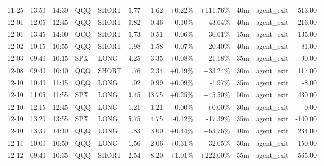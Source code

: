 \documentclass[11pt,a4paper,twoside]{article}
\begin{document}
\begin{center}
\begin{longtable}{>{\color{txtmain}}l l l l l r r r r r >{\color{txtmain}}l r}
11-25 & 13:50 & 14:30 & QQQ & SHORT & 0.77 & 1.62 & \textcolor{wingreen}{+0.22\%} & \textcolor{wingreen}{+111.76\%} & 40m & agent\_exit & \textcolor{wingreen}{513.00} \\
12-01 & 12:05 & 12:45 & QQQ & SHORT & 0.82 & 0.46 & \textcolor{lossred}{-0.10\%} & \textcolor{lossred}{-43.64\%} & 40m & agent\_exit & \textcolor{lossred}{-216.00} \\
12-01 & 13:45 & 14:00 & QQQ & SHORT & 0.73 & 0.51 & \textcolor{lossred}{-0.06\%} & \textcolor{lossred}{-30.61\%} & 15m & agent\_exit & \textcolor{lossred}{-135.00} \\
12-02 & 10:15 & 10:55 & QQQ & SHORT & 1.98 & 1.58 & \textcolor{lossred}{-0.07\%} & \textcolor{lossred}{-20.40\%} & 40m & agent\_exit & \textcolor{lossred}{-81.00} \\
12-03 & 09:40 & 10:15 & SPX & LONG & 4.25 & 3.35 & \textcolor{wingreen}{+0.08\%} & \textcolor{lossred}{-21.18\%} & 35m & agent\_exit & \textcolor{lossred}{-90.00} \\
12-08 & 09:40 & 10:10 & QQQ & SHORT & 1.76 & 2.34 & \textcolor{wingreen}{+0.19\%} & \textcolor{wingreen}{+33.24\%} & 30m & agent\_exit & \textcolor{wingreen}{117.00} \\
12-10 & 10:40 & 11:15 & QQQ & LONG & 1.02 & 0.99 & \textcolor{wingreen}{+0.09\%} & \textcolor{lossred}{-1.97\%} & 35m & agent\_exit & \textcolor{lossred}{-8.00} \\
12-10 & 11:05 & 11:55 & SPX & LONG & 9.45 & 13.75 & \textcolor{wingreen}{+0.25\%} & \textcolor{wingreen}{+45.50\%} & 50m & agent\_exit & \textcolor{wingreen}{430.00} \\
12-10 & 12:15 & 12:45 & QQQ & LONG & 1.21 & 1.21 & \textcolor{lossred}{-0.00\%} & \textcolor{wingreen}{+0.00\%} & 30m & agent\_exit & \textcolor{wingreen}{0.00} \\
12-10 & 13:20 & 13:55 & SPX & LONG & 5.75 & 4.75 & \textcolor{lossred}{-0.12\%} & \textcolor{lossred}{-17.39\%} & 35m & agent\_exit & \textcolor{lossred}{-100.00} \\
12-10 & 13:30 & 14:10 & QQQ & LONG & 1.83 & 3.00 & \textcolor{wingreen}{+0.44\%} & \textcolor{wingreen}{+63.76\%} & 40m & agent\_exit & \textcolor{wingreen}{234.00} \\
12-11 & 10:00 & 10:50 & QQQ & LONG & 1.56 & 2.06 & \textcolor{wingreen}{+0.31\%} & \textcolor{wingreen}{+32.05\%} & 50m & agent\_exit & \textcolor{wingreen}{150.00} \\
12-12 & 09:40 & 10:35 & QQQ & SHORT & 2.54 & 8.20 & \textcolor{wingreen}{+1.01\%} & \textcolor{wingreen}{+222.00\%} & 55m & agent\_exit & \textcolor{wingreen}{565.00} \\

\end{longtable}
\end{center}
\end{document}

